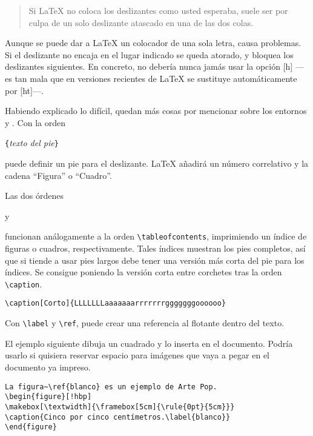 \begin{quote}
Si \LaTeX{} no coloca los deslizantes como usted esperaba, suele ser por culpa de un solo deslizante atascado en una de las dos colas. 
\end{quote}

Aunque se puede dar a \LaTeX{} un colocador de una sola letra, causa problemas.  Si el deslizante no encaja en el lugar indicado se queda atorado, y bloquea los deslizantes siguientes.  En concreto, no debería nunca jamás usar la opción [h] ---es tan mala que en versiones recientes de \LaTeX{} se sustituye automáticamente por [ht]---.

\bigskip
Habiendo explicado lo difícil, quedan más cosas por mencionar sobre los entornos  y .  Con la orden

\begin{lscommand}
\verb|{|\emph{texto del pie}\verb|}|
\end{lscommand}

puede definir un pie para el deslizante.  \LaTeX{} añadirá un número correlativo y la cadena ``Figura'' o ``Cuadro''.

Las dos órdenes

\begin{lscommand}
 y  
\end{lscommand}

funcionan análogamente a la orden \verb|\tableofcontents|, imprimiendo un índice de figuras o cuadros, respectivamente.  Tales índices muestran los pies completos, así que si tiende a usar pies largos debe tener una versión más corta del pie para los índices.  Se consigue poniendo la versión corta entre corchetes tras la
orden \verb|\caption|.
\begin{code}
\verb|\caption[Corto]{LLLLLLLaaaaaaarrrrrrrgggggggoooooo}| 
\end{code}

Con \verb|\label| y \verb|\ref|, puede crear una referencia al flotante dentro del texto.

El ejemplo siguiente dibuja un cuadrado y lo inserta en el documento. Podría usarlo si quisiera reservar espacio para imágenes que vaya a pegar en el documento ya impreso.

\begin{code}
\begin{verbatim}
La figura~\ref{blanco} es un ejemplo de Arte Pop.
\begin{figure}[!hbp]
\makebox[\textwidth]{\framebox[5cm]{\rule{0pt}{5cm}}}
\caption{Cinco por cinco centímetros.\label{blanco}}
\end{figure}
\end{verbatim}
\end{code}

